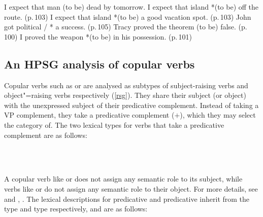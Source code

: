 \documentclass[output=paper
	        ,collection
	        ,collectionchapter
 	        ,biblatex
                ,babelshorthands
                ,newtxmath
                ,draftmode
                ,colorlinks, citecolor=brown
]{langscibook}
\begin{document}
\eal
\label{ex-expect}
\ex I expect that man (to be) dead  by tomorrow. \citep[]{PollardandSag1994}
\ex I expect that island *(to be) off the route. (p.\,103)
\ex I expect that island *(to be) a good vacation spot. (p.\,103)
\zl
\ea
\label{ex-get}
John got political / * a success. (p.\,105)	
\z
\eal
\label{ex-prove}
\ex Tracy proved the theorem (to be) false. (p.\,100)
\ex I proved the weapon *(to be) in his possession.	(p.\,101)
\zl
	


\subsection{An HPSG analysis of copular verbs}
\label{control-sec-copula-verbs}
	
Copular verbs such as  or  are analysed as subtypes of subject-raising verbs and object"=raising verbs respectively (\ref{rsg}). They share their subject (or object) with the unexpressed subject of their predicative complement. Instead of taking a VP complement, they take a predicative complement (\prd $+$), which they may select the category of.
 The two
lexical types for verbs that take a predicative complement are as follows:

\eal
\ex {} \impl\\
\ex {} \impl\\ 
\zl

A copular verb like  or  does not assign any semantic role to its subject, while
verbs like  or  do not assign any semantic role to their object. For more details, see  and  , . 
The lexical descriptions for predicative  and predicative 
 inherit from the  type and  type
respectively, and are as follows:
\end{document}
